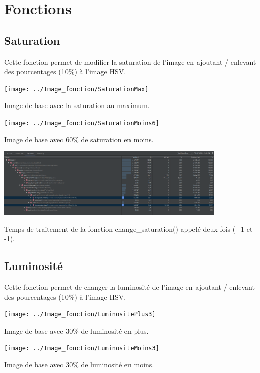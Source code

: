 \documentclass{article}
\begin{document}
\section{Fonctions}

\subsection{Saturation}
Cette fonction permet de modifier la saturation de l'image en ajoutant / enlevant des pourcentages (10\%) à l'image HSV.
\bigbreak

\begin{center} 
    \texttt{[image: ../Image\_fonction/SaturationMax]}

    Image de base avec la saturation au maximum.
\end{center}

\begin{center} 
    \texttt{[image: ../Image\_fonction/SaturationMoins6]}

    Image de base avec 60\% de saturation en moins.
\end{center}

\begin{center} 
    \includegraphics[width=11cm]{../Image_temps/TempsChangeSaturation}

    Temps de traitement de la fonction change_saturation() appelé deux fois (+1 et -1).
\end{center}

\subsection{Luminosité}
Cette fonction permet de changer la luminosité de l'image en ajoutant / enlevant des pourcentages (10\%) à l'image HSV.
\bigbreak

\begin{center} 
    \texttt{[image: ../Image\_fonction/LuminositePlus3]}

    Image de base avec 30\% de luminosité en plus.
\end{center}

\begin{center} 
    \texttt{[image: ../Image\_fonction/LuminositeMoins3]}

    Image de base avec 30\% de luminosité en moins.
\end{center}
\end{document}
